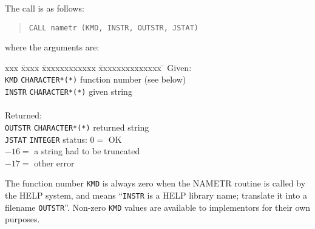 The call is as follows:
\begin{verse}
\verb|CALL nametr (KMD, INSTR, OUTSTR, JSTAT)|
\end{verse}
where the arguments are:
\begin{tabbing}
xxx \= xxxx \= xxxxxxxxxxxx \= xxxxxxxxxxxxxx \= \kill
\> Given: \\
\> \> \verb|KMD| \> \verb|CHARACTER*(*)| \> function number (see below) \\
\> \> \verb|INSTR| \> \verb|CHARACTER*(*)| \> given string \\ \\
\> Returned: \\
\> \> \verb|OUTSTR| \> \verb|CHARACTER*(*)| \> returned string \\
\> \> \verb|JSTAT| \> \verb|INTEGER| \> status:  $0=$ OK \\
\> \> \> \> \hspace{1.7em}         $-16=$ a string had to be truncated \\
\> \> \> \> \hspace{1.7em}         $-17=$ other error
\end{tabbing}
The function number \verb|KMD| is always zero when the NAMETR routine
is called by the HELP system, and means ``\verb|INSTR| is a HELP
library name; translate it into a filename \verb|OUTSTR|''.  Non-zero
\verb|KMD| values are available to implementors for their own
purposes.

